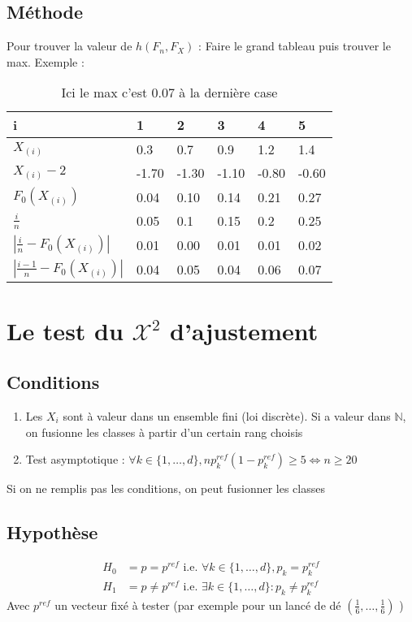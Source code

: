 \documentclass{article}
\theoremstyle{plain}%
\theoremstyle{definition}
\theoremstyle{remark}
\begin{document}
\subsection*{Méthode}
Pour trouver la valeur de $ h(F_n, F_X) $ : Faire le grand tableau puis trouver le max. Exemple : 
\begin{table}[!h]
    \centering
    \begin{tabular}{|l|l|l|l|l|l|}
    \hline
        i & 1 & 2 & 3 & 4 & 5 \\ \hline
        $X_{(i)}$ & 0.3 & 0.7 & 0.9 & 1.2 & 1.4 \\ \hline
        $X_{(i)} - 2$ & -1.70 & -1.30 & -1.10 & -0.80 & -0.60 \\ \hline
        $F_0(X_{(i)})$ & 0.04 & 0.10 & 0.14 & 0.21 & 0.27 \\ \hline
        $\frac{i}{n}$ & 0.05 & 0.1 & 0.15 & 0.2 & 0.25 \\ \hline
        $|\frac{i}{n} - F_0(X_{(i)})|$ & 0.01 & 0.00 & 0.01 & 0.01 & 0.02 \\ \hline
        $|\frac{i-1}{n} - F_0(X_{(i)})|$ & 0.04 & 0.05 & 0.04 & 0.06 & 0.07 \\ \hline
    \end{tabular}
    \caption{Ici le max c'est $0.07$ à la dernière case}
\end{table}



\section{Le test du $ \mathcal{X}^2 $ d'ajustement}
\subsection*{Conditions}
\begin{enumerate}
    \item Les $ X_i $ sont à valeur dans un ensemble fini (loi discrète). Si a valeur dans $ \mathbb{N} $, on fusionne les classes à partir d'un certain rang choisis 
    \item Test asymptotique : $ \forall k \in \{1, \dots, d\}, np_k^{ref}(1-p_k^{ref}) \geq 5 \Leftrightarrow n \geq 20$ 
\end{enumerate}
Si on ne remplis pas les conditions, on peut fusionner les classes 

\subsection*{Hypothèse}
\begin{align*}
    H_0 &= p = p^{ref} \text{ i.e. } \forall k \in \{1,\dots,d\}, p_k = p_k^{ref} \\
    H_1 &= p \neq p^{ref} \text{ i.e. } \exists k \in \{1, \dots, d\}: p_k \neq p_k^{ref}
\end{align*}
Avec $ p^{ref} $ un vecteur fixé à tester (par exemple pour un lancé de dé $ (\frac{1}{6}, \dots, \frac{1}{6}) $ )
\end{document}
